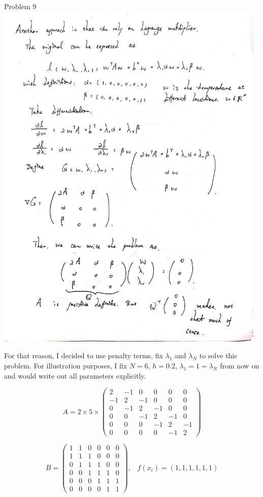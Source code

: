 \documentclass[10pt]{article}
\begin{document}
\begin{section}{Problem 9}
\includegraphics[width=13cm]{img/problem9_proof.png}

For that reason, I decided to use penalty terms, fix $\lambda_1$ and $\lambda_N$ to solve this problem. For illustration purposes, I fix $N = 6$, $h = 0.2$, $\lambda_1 = 1 = \lambda_N$ from now on and would write out all parameters explicitly. 

\[A = 2 \times 5 \times \begin{pmatrix}
2 & -1 & 0 & 0 & 0 &0\\
-1 & 2 & -1 & 0 & 0 &0\\
0 & -1 & 2 & -1 & 0 &0\\
0 & 0 & -1 & 2 & -1 &0\\
0 & 0 & 0 & -1 & 2 &-1\\
0 & 0 & 0 & 0 & -1 &2 \end{pmatrix}\]

\[B = \begin{pmatrix}
1 & 1 & 0 & 0 & 0 &0\\
1 & 1 & 1 & 0 & 0 &0\\
0 & 1 & 1 & 1 & 0 &0\\
0 & 0 & 1 & 1 & 1 &0\\
0 & 0 & 0 & 1 & 1 &1\\
0 & 0 & 0 & 0 & 1 &1 \end{pmatrix}, \;\;\; f(x_i) = (1, 1, 1, 1, 1, 1)\]


\end{section}
\end{document}
